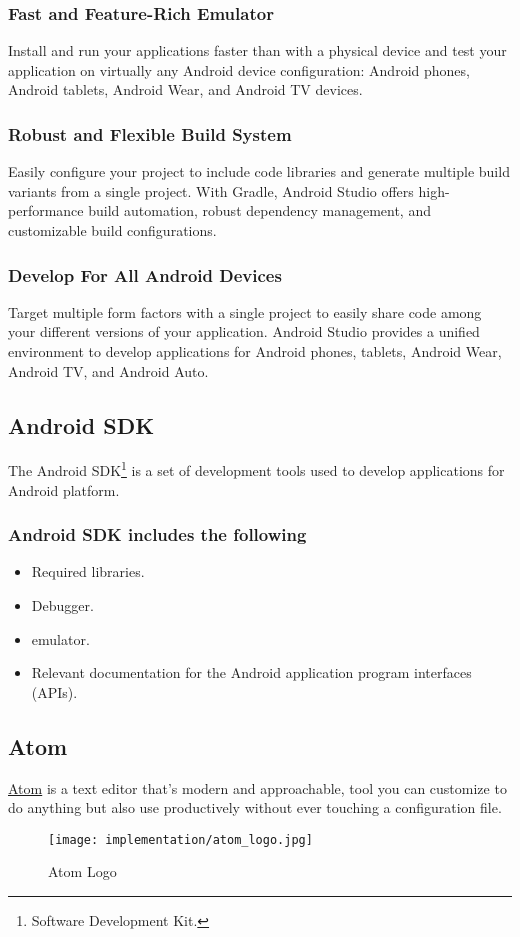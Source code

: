 	\subsubsection{Fast and Feature-Rich Emulator}
		Install and run your applications faster than with a physical device and test your application on virtually any Android device configuration: Android phones, Android tablets, Android Wear, and Android TV devices.
	\subsubsection{Robust and Flexible Build System}
		Easily configure your project to include code libraries and generate multiple build variants from a single project. With Gradle, Android Studio offers high-performance build automation, robust dependency management, and customizable build configurations.
	\subsubsection{Develop For All Android Devices}
		Target multiple form factors with a single project to easily share code among your different versions of your application. Android Studio provides a unified environment to develop applications for Android phones, tablets, Android Wear, Android TV, and Android Auto.
\subsection{Android SDK}
	The Android SDK\footnote{Software Development Kit.} is a set of development tools used to develop applications for Android platform.
	\subsubsection{Android SDK includes the following}
		\begin{itemize}
			\item Required libraries.
			\item Debugger.
			\item emulator.
			\item Relevant documentation for the Android application program interfaces (APIs).
		\end{itemize}
\subsection{Atom}
	\href{https://www.atom.io}{Atom} is a text editor that's modern and approachable, tool you can customize to do anything but also use productively without ever touching a configuration file.\cite{atom}
	\begin{figure}[ht]
		\centering
		\texttt{[image: implementation/atom\_logo.jpg]}
		\caption{Atom Logo}
	\end{figure}
